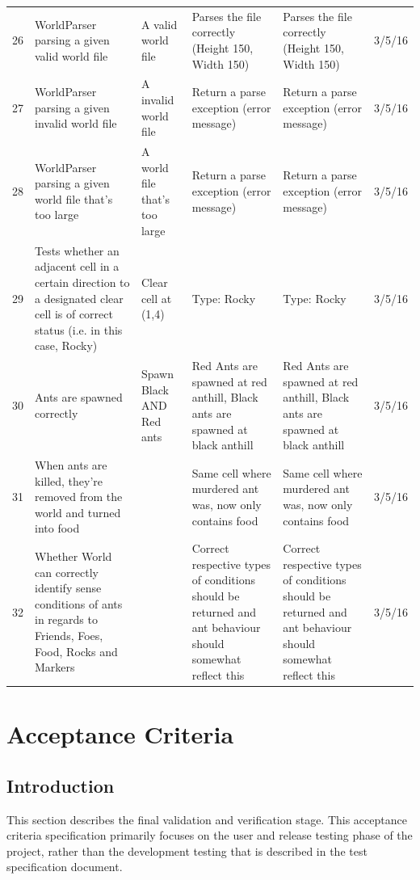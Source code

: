 \documentclass[11pt]{article}
\begin{document}
\begin{center}
\begin{longtable}[c]{@{}p{} p{} p{} p{} p{} p{}@{}}
\tabularnewline
26 & WorldParser parsing a given valid world file & A valid world file &
Parses the file correctly (Height 150, Width 150) & Parses the file
correctly (Height 150, Width 150) & 3/5/16 \tabularnewline
27 & WorldParser parsing a given invalid world file & A invalid world
file & Return a parse exception (error message) & Return a parse
exception (error message) & 3/5/16 \tabularnewline
28 & WorldParser parsing a given world file that's too large & A world
file that's too large & Return a parse exception (error message) &
Return a parse exception (error message) & 3/5/16 \tabularnewline
29 & Tests whether an adjacent cell in a certain direction to a
designated clear cell is of correct status (i.e. in this case, Rocky) &
Clear cell at (1,4) & Type: Rocky & Type: Rocky & 3/5/16
\tabularnewline
30 & Ants are spawned correctly & Spawn Black AND Red ants & Red Ants
are spawned at red anthill, Black ants are spawned at black anthill &
Red Ants are spawned at red anthill, Black ants are spawned at black
anthill & 3/5/16 \tabularnewline
31 & When ants are killed, they're removed from the world and turned
into food & & Same cell where murdered ant was, now only contains food &
Same cell where murdered ant was, now only contains food & 3/5/16
\tabularnewline
32 & Whether World can correctly identify sense conditions of ants in
regards to Friends, Foes, Food, Rocks and Markers & & Correct respective
types of conditions should be returned and ant behaviour should somewhat
reflect this & Correct respective types of conditions should be returned
and ant behaviour should somewhat reflect this & 3/5/16 \tabularnewline
\bottomrule
\end{longtable}
\end{center}

\section{Acceptance Criteria}\label{acceptance-criteria}

\subsection{Introduction}\label{introduction}

This section describes the final validation and verification stage.
This acceptance criteria specification primarily focuses on the user and
release testing phase of the project, rather than the development
testing that is described in the test specification document.
\end{document}
